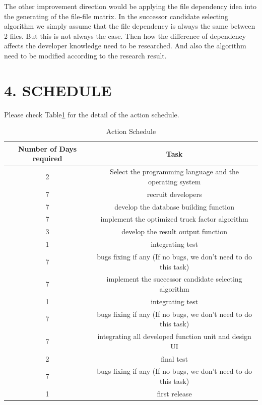 \documentclass[12pt, a4paper, openright]{report}
\begin{document}
The other improvement direction would be applying the file dependency idea into the generating of the file-file matrix. In the successor candidate selecting algorithm we simply assume that the file dependency is always the same between 2 files. But this is not always the case. Then how the difference of dependency affects the developer knowledge need to be researched. And also the algorithm need to be modified according to the research result.    
\newpage
\section* {4. SCHEDULE}
Please check Table\ref{schedule} for the detail of the action schedule.
\begin{table}[h]		
	\centering            
	\caption{Action Schedule}            
	\begin{tabular}{|c|c|}            
		\hline Number of Days required & Task   \\ \hline
		  2 & Select the programming language and the operating system \\ \hline
		  7 & recruit developers  \\ \hline
		  7 & develop the database building function  \\ \hline
          7 & implement the optimized truck factor algorithm  \\ \hline
          3 & develop the result output function \\ \hline
          1 & integrating test  \\ \hline
          7 & bugs fixing if any  (If no bugs, we don't need to do this task)\\ \hline
          7 & implement the successor candidate selecting algorithm \\ \hline
          1 & integrating test  \\ \hline
          7 & bugs fixing if any  (If no bugs, we don't need to do this task)\\ \hline
          7 & integrating all developed function unit and design UI  \\ \hline
          2 & final test \\ \hline
          7 & bugs fixing if any  (If no bugs, we don't need to do this task)\\ \hline
          1 & first release  \\ \hline
	\end{tabular}            
	\label{schedule}            
\end{table}
\newpage
\end{document}
